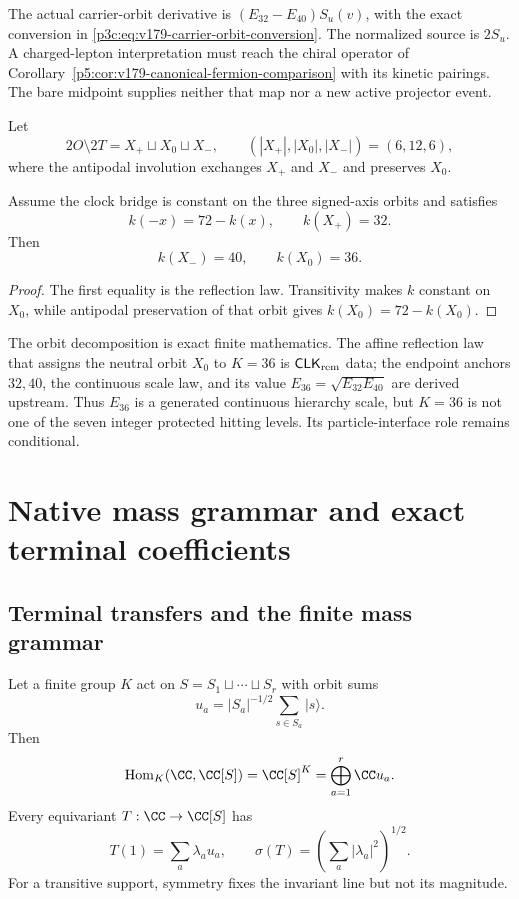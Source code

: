 \documentclass[12pt,a4paper]{article}
\newcommand{\CLKrem}{\mathsf{CLK}_{\rm rem}}
\newcommand{\HomG}{\operatorname{Hom}}
\begin{document}
The actual carrier-orbit derivative is
\((E_{32}-E_{40})S_u(v)\), with the exact conversion in
\eqref{p3c:eq:v179-carrier-orbit-conversion}.
The normalized source is \(2S_u\).  A charged-lepton interpretation must
reach the chiral operator of
Corollary~\ref{p5:cor:v179-canonical-fermion-comparison} with its kinetic
pairings.  The bare midpoint supplies neither that map nor a new active
projector event.



Let
\[
2O\setminus2T=X_+\sqcup X_0\sqcup X_-,
\qquad
(|X_+|,|X_0|,|X_-|)=(6,12,6),
\]
where the antipodal involution exchanges \(X_+\) and \(X_-\) and preserves
\(X_0\).

\begin{theorem}
\label{p6:thm:antipodal-midpoint}
Assume the clock bridge is constant on the three signed-axis orbits and
satisfies
\[
k(-x)=72-k(x),
\qquad
k(X_+)=32.
\]
Then
\[
k(X_-)=40,\qquad k(X_0)=36.
\]
\end{theorem}

\begin{proof}
The first equality is the reflection law.  Transitivity makes \(k\) constant
on \(X_0\), while antipodal preservation of that orbit gives
\(k(X_0)=72-k(X_0)\).
\end{proof}

\begin{remark}
The orbit decomposition is exact finite mathematics.  The affine reflection
law that assigns the neutral orbit \(X_0\) to \(K=36\) is \(\CLKrem\) data;
the endpoint anchors \(32,40\), the continuous scale law, and its value
\(E_{36}=\sqrt{E_{32}E_{40}}\) are derived upstream.  Thus \(E_{36}\) is a
generated continuous hierarchy scale, but \(K=36\) is not one of the seven
integer protected hitting levels.  Its particle-interface role remains
conditional.
\end{remark}


\section{Native mass grammar and exact terminal coefficients}
\label{p5b:sec:organized-mass}
\subsection{Terminal transfers and the finite mass grammar}
\label{p6:sec:terminal-transfers}

\begin{theorem}
\label{p6:thm:terminal-transfer-classification}
Let a finite group \(K\) act on
\(
S=S_1\sqcup\cdots\sqcup S_r
\)
with orbit sums
\[
u_a=|S_a|^{-1/2}\sum_{s\in S_a}|s\rangle.
\]
Then
\[
\HomG_K(\CC,\CC[S])
=\CC[S]^K
=\bigoplus_{a=1}^r\CC u_a.
\]
Every equivariant \(T:\CC\to\CC[S]\) has
\[
T(1)=\sum_a\lambda_au_a,
\qquad
\sigma(T)=\left(\sum_a|\lambda_a|^2\right)^{1/2}.
\]
For a transitive support, symmetry fixes the invariant line but not its
magnitude.
\end{theorem}
\end{document}

